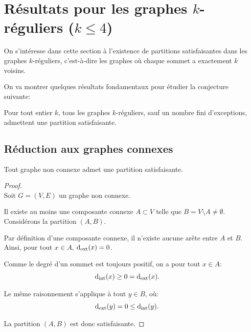 \section{Résultats pour les graphes \(k\)-réguliers (\(k \leq 4\))}\label{sec:results}

On s'intéresse dans cette section à l'existence de partitions satisfaisantes dans les graphes \(k\)-réguliers, c'est-à-dire les graphes où chaque sommet a exactement \(k\) voisins.

On va montrer quelques résultats fondamentaux pour étudier la conjecture suivante:

\begin{conjecture}
    Pour tout entier \(k\), tous les graphes \(k\)-réguliers, sauf un nombre fini d'exceptions, admettent une partition satisfaisante.
\end{conjecture}

\subsection{Réduction aux graphes connexes}


\begin{proposition}
    Tout graphe non connexe admet une partition satisfaisante.
\end{proposition}

\begin{proof}\,\\
    Soit \(G=(V,E)\) un graphe non connexe.

    Il existe au moins une composante connexe \(A \subset V\) telle que \(B = V \setminus A \neq \emptyset\).
    Considérons la partition \((A, B)\).

    Par définition d'une composante connexe, il n'existe aucune arête entre \(A\) et \(B\).
    Ainsi, pour tout \(x \in A\), \(\operatorname{d_{\mathrm{ext}}}(x) = 0\).

    Comme le degré d'un sommet est toujours positif, on a pour tout \(x \in A\):
    \[
        \operatorname{d_{\mathrm{int}}}(x) \geq 0 = \operatorname{d_{\mathrm{ext}}}(x).
    \]

    Le même raisonnement s'applique à tout \(y \in B\), où:
    \[
        \operatorname{d_{\mathrm{ext}}}(y) = 0 \leq \operatorname{d_{\mathrm{int}}}(y).
    \]

    La partition \((A, B)\) est donc satisfaisante.
\end{proof}

